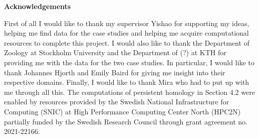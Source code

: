 \newenvironment{acknowledgements}%
    {\cleardoublepage\thispagestyle{empty}\null\vfill\begin{center}%
    \bfseries Acknowledgements\end{center}}%
    {\vfill\null}
        \begin{acknowledgements}
First of all I would like to thank my supervisor Yishao for supporting my ideas, helping me find data for the case studies and helping me acquire computational resources to complete this project. I would also  like to thank the Department of Zoology at Stockholm University and the Department of (?) at KTH for providing me with the data for the two case studies. In particular, I would like to thank Johannes Hjorth and Emily Baird for giving me insight into their respective domains. Finally, I would like to thank Mira who had to put up with me through all this.
        \end{acknowledgements}
\vspace{-1cm}
The computations of persistent homology in Section 4.2 were enabled by resources provided by the Swedish National Infrastructure for Computing (SNIC) at High Performance Computing Center North (HPC2N) partially funded by the Swedish Research Council through grant agreement no. 2021-22166.
